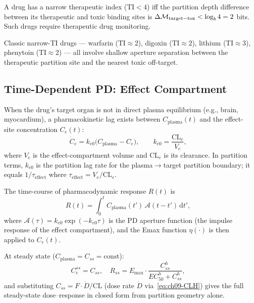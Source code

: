 \begin{corollary}
\label{cor:ch09-NTI}
A drug has a narrow therapeutic index ($\mathrm{TI} < 4$) iff the partition
depth difference between its therapeutic and toxic binding sites is
$\Delta\mathcal{M}_{\mathrm{target-tox}} < \log_b 4 = 2$ bits.  Such drugs
require therapeutic drug monitoring.
\end{corollary}

Classic narrow-TI drugs --- warfarin ($\mathrm{TI} \approx 2$), digoxin
($\mathrm{TI} \approx 2$), lithium ($\mathrm{TI} \approx 3$), phenytoin
($\mathrm{TI} \approx 2$) --- all involve shallow aperture separation between
the therapeutic partition site and the nearest toxic off-target.

\subsection{Time-Dependent PD: Effect Compartment}
\label{subsec:ch09-effect-compartment}

When the drug's target organ is not in direct plasma equilibrium (e.g., brain,
myocardium), a pharmacokinetic lag exists between $C_{\mathrm{plasma}}(t)$
and the effect-site concentration $C_e(t)$:
\begin{equation}
  \dot{C}_e = k_{e0}\bigl(C_{\mathrm{plasma}} - C_e\bigr),
  \qquad k_{e0} = \frac{\mathrm{CL}_e}{V_e},
  \label{eq:ch09-effect-comp}
\end{equation}
where $V_e$ is the effect-compartment volume and $\mathrm{CL}_e$ is its
clearance.  In partition terms, $k_{e0}$ is the partition lag rate for the
plasma$\to$target partition boundary; it equals $1/\tau_{\mathrm{effect}}$
where $\tau_{\mathrm{effect}} = V_e/\mathrm{CL}_e$.

\begin{theorem}[PK/PD Convolution]
\label{thm:ch09-pkpd-conv}
The time-course of pharmacodynamic response $R(t)$ is
\begin{equation}
  R(t) = \int_0^t C_{\mathrm{plasma}}(t')\,
      \mathcal{A}(t - t')\,\mathrm{d}t',
  \label{eq:ch09-pkpd-conv}
\end{equation}
where $\mathcal{A}(\tau) = k_{e0}\exp(-k_{e0}\tau)$ is the PD aperture
function (the impulse response of the effect compartment), and the Emax
function $\eta(\cdot)$ is then applied to $C_e(t)$.
\end{theorem}

At steady state ($C_{\mathrm{plasma}} = C_{ss} = \text{const}$):
\begin{equation}
  C_e^{ss} = C_{ss}, \quad
  R_{ss} = E_{\max}\cdot\frac{C_{ss}^h}{EC_{50}^h + C_{ss}^h},
  \label{eq:ch09-Rss}
\end{equation}
and substituting $C_{ss} = F \cdot \dot{D}/\mathrm{CL}$ (dose rate $\dot{D}$
via~\eqref{eq:ch09-CLH}) gives the full steady-state dose--response in closed
form from partition geometry alone.

